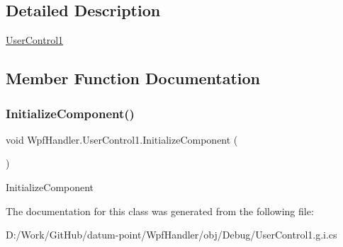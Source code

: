 \subsection{Detailed Description}
\mbox{\hyperlink{class_wpf_handler_1_1_user_control1}{User\+Control1}} 



\subsection{Member Function Documentation}
\mbox{\label{class_wpf_handler_1_1_user_control1_a4be9da09a92a3fd301a67bf224d2f3d5}} 
\subsubsection{\texorpdfstring{Initialize\+Component()}{InitializeComponent()}}
{\footnotesize\ttfamily void Wpf\+Handler.\+User\+Control1.\+Initialize\+Component (\begin{DoxyParamCaption}{ }\end{DoxyParamCaption})}



Initialize\+Component 



The documentation for this class was generated from the following file\+:\begin{DoxyCompactItemize}
\item 
D\+:/\+Work/\+Git\+Hub/datum-\/point/\+Wpf\+Handler/obj/\+Debug/User\+Control1.\+g.\+i.\+cs\end{DoxyCompactItemize}
